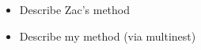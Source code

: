 \documentclass{aastex61}
\begin{document}
\begin{itemize}
\item Describe Zac's method
\item Describe my method (via multinest)
\end{itemize}

\end{document}
